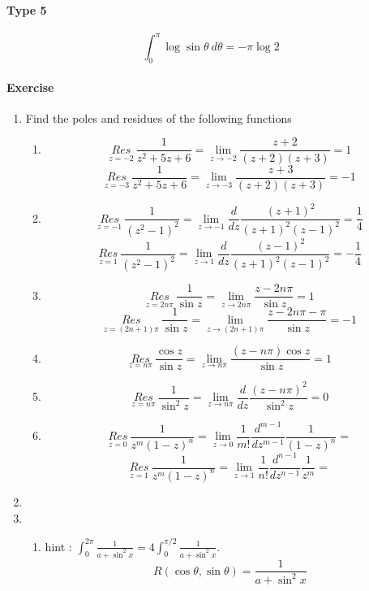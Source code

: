 \paragraph{Type 5}
\begin{equation}
	\int_0^\pi \log \sin \theta\ d\theta = -\pi \log 2
\end{equation}

\paragraph{Exercise}
\begin{enumerate}
	\item Find the poles and residues of the following functions
	\begin{enumerate}
		\item 
			\[ \underset{z=-2}{Res}\ \frac{1}{z^2+5z+6} = \lim_{z \to -2} \frac{z+2}{(z+2)(z+3)} = 1  \]
			\[ \underset{z = -3}{Res}\ \frac{1}{z^2+5z+6} = \lim_{z \to -3} \frac{z+3}{(z+2)(z+3)} = -1  \]
		\item 
			\[ \underset{z=-1}{Res}\ \frac{1}{(z^2-1)^2} = \lim_{z \to -1} \frac{d}{dz}\frac{(z+1)^2}{(z+1)^2(z-1)^2} = \frac{1}{4} \]
			\[ \underset{z=1}{Res}\ \frac{1}{(z^2-1)^2} = \lim_{z \to 1} \frac{d}{dz}\frac{(z-1)^2}{(z+1)^2(z-1)^2} = -\frac{1}{4} \]
		\item 
			\[ \underset{z=2n\pi}{Res} \ \frac{1}{\sin z} = \lim_{z \to 2n\pi} \frac{z-2n\pi}{\sin z} = 1 \]
			\[ \underset{z=(2n+1)\pi}{Res} \ \frac{1}{\sin z} = \lim_{z \to (2n+1)\pi} \frac{z-2n\pi-\pi}{\sin z} = -1 \]
		\item
			\[ \underset{z=n\pi}{Res} \ \frac{\cos z}{\sin z} = \lim_{z \to n\pi} \frac{(z-n\pi)\cos z}{\sin z} = 1 \]
		\item 
			\[ \underset{z=n\pi}{Res} \ \frac{1}{\sin^2 z} = \lim_{z \to n\pi}\frac{d}{dz}\frac{(z-n\pi)^2}{\sin^2 z} = 0 \]
		\item
			\[ \underset{z=0}{Res} \ \frac{1}{z^m(1-z)^n} = \lim_{z \to 0} \frac{1}{m!} \frac{d^{m-1}}{dz^{m-1}}\frac{1}{(1-z)^n} =  \]
			\[ \underset{z=1}{Res} \ \frac{1}{z^m(1-z)^n} = \lim_{z \to 1} \frac{1}{n!} \frac{d^{n-1}}{dz^{n-1}}\frac{1}{z^m} =  \]
	\end{enumerate}
	\item 
	\item
	\begin{enumerate}
		\item hint : $\int_0^{2\pi} \frac{1}{a+\sin^2 x} = 4 \int_0^{\pi/2} \frac{1}{a+\sin^2 x}$.
			\[ R(\cos \theta,\sin \theta) = \frac{1}{a+\sin^2 x} \]

\end{enumerate}
\end{enumerate}
